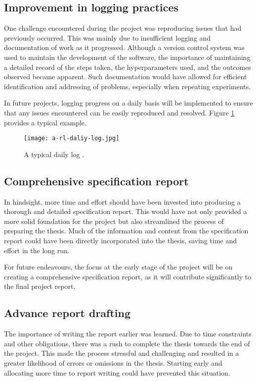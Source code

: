 \subsection{Improvement in logging practices}

One challenge encountered during the project was reproducing issues that had previously occurred. This was mainly due to insufficient logging and documentation of work as it progressed. Although a version control system was used to maintain the development of the software, the importance of maintaining a detailed record of the steps taken, the hyperparameters used, and the outcomes observed became apparent. Such documentation would have allowed for efficient identification and addressing of problems, especially when repeating experiments.

In future projects, logging progress on a daily basis will be implemented to ensure that any issues encountered can be easily reproduced and resolved. Figure \ref{fig:daliy-log} provides a typical example.

\begin{figure}[htbp]
\centering
\texttt{[image: a-rl-daliy-log.jpg]}
\caption{A typical daily log \cite{ref:reproducing-drl}.}
\label{fig:daliy-log}
\end{figure}

\subsection{Comprehensive specification report}

In hindsight, more time and effort should have been invested into producing a thorough and detailed specification report. This would have not only provided a more solid foundation for the project but also streamlined the process of preparing the thesis. Much of the information and content from the specification report could have been directly incorporated into the thesis, saving time and effort in the long run.

For future endeavours, the focus at the early stage of the project will be on creating a comprehensive specification report, as it will contribute significantly to the final project report.

\subsection{Advance report drafting}

The importance of writing the report earlier was learned. Due to time constraints and other obligations, there was a rush to complete the thesis towards the end of the project. This made the process stressful and challenging and resulted in a greater likelihood of errors or omissions in the thesis. Starting early and allocating more time to report writing could have prevented this situation.

